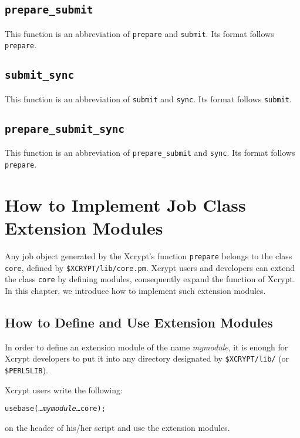 \documentclass[a4paper,10pt]{report}
\def\|{\verb|} %|
\begin{document}
\section{\texttt{prepare\_submit}}

This function is an abbreviation of \texttt{prepare} and
\texttt{submit}.  Its format follows \texttt{prepare}.

\section{\texttt{submit\_sync}}

This function is an abbreviation of \texttt{submit} and
\texttt{sync}.  Its format follows \texttt{submit}.

\section{\texttt{prepare\_submit\_sync}}

This function is an abbreviation of \texttt{prepare\_submit} and
\texttt{sync}.  Its format follows \texttt{prepare}.

\appendix
\chapter{How to Implement Job Class Extension Modules}

Any job object generated by the Xcrypt's function \|prepare| belongs
to the class \|core|, defined by \|$XCRYPT/lib/core.pm|.
Xcrypt users and developers can extend the class \|core| by defining
modules, consequently expand the function of Xcrypt.
In this chapter, we introduce how to implement such extension modules.

\section{How to Define and Use Extension Modules}

In order to define an extension module of the name \textit{mymodule},
it is enough for Xcrypt developers to put it into any directory
designated by \|$XCRYPT/lib/| (or \|$PERL5LIB|).

Xcrypt users write the following:
\begin{screen}
\begin{alltt}
use base (\ldots {\it mymodule} \ldots core);
\end{alltt}
\end{screen}
on the header of his/her script and use the extension modules.
\end{document}
